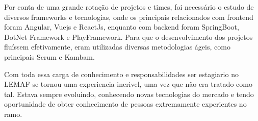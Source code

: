 Por conta de uma grande rotação de projetos e times, foi necessário o estudo de diversos frameworks e tecnologias, onde os principais relacionados com frontend foram Angular, Vuejs e ReactJs, enquanto com backend foram SpringBoot, DotNet Framework e PlayFramework.
Para que o desenvolvimento dos projetos fluíssem efetivamente, eram utilizadas diversas metodologias ágeis, como principais Scrum e Kambam.

Com toda essa carga de conhecimento e responsabilidades ser estagiario no LEMAF se tornou uma experiencia incrivel, uma vez que não era tratado como tal. Estava sempre evoluindo, conhecendo novas tecnologias do mercado e tendo oportunidade de obter conhecimento de pessoas extremamente experientes no ramo.